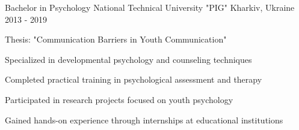 


\begin{cventries}


\cventry
{Bachelor in Psychology} %
{National Technical University "PIG"} %
{Kharkiv, Ukraine} %
{2013 - 2019} %
{ %
\begin{cvitems}
\item {Thesis: "Communication Barriers in Youth Communication"}
\item {Specialized in developmental psychology and counseling techniques}
\item {Completed practical training in psychological assessment and therapy}
\item {Participated in research projects focused on youth psychology}
\item {Gained hands-on experience through internships at educational institutions}
\end{cvitems}
}


\end{cventries}